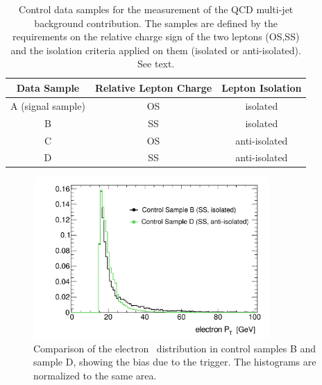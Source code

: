\begin{table} [!tp]
\centering
\begin{tabular}{c c c }
\hline
Data Sample & Relative Lepton Charge & Lepton Isolation \\ [0.5ex]
\hline
A (signal sample) & OS & isolated \\
\hline
B & SS & isolated \\
C & OS & anti-isolated \\
D & SS & anti-isolated \\ [1ex]
\hline
\end{tabular}
\caption{Control data samples for the measurement of the QCD multi-jet background contribution. The samples are defined by the requirements on the relative
	charge sign of the two leptons (OS,SS) and the isolation criteria applied on them (isolated or anti-isolated). See text.}
\label{table:qcd}
\end{table}

\begin{figure}[tp]
	\begin{center}
	\includegraphics[width=9cm]{figure/ABCD_regionB_Vs_regionD2}
	\end{center}
	\caption{Comparison of the electron \pt~distribution in control samples B and sample D, showing the bias due to the trigger. 
	The histograms are normalized to the same area.}
	\label{fig:BvsD}
\end{figure}

